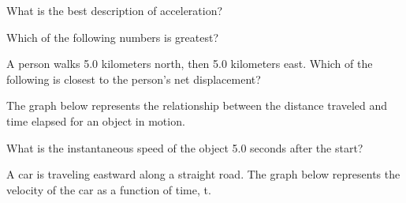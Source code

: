 \documentclass[10pt]{examdesign}
\begin{document}
\begin{multiplechoice} [title={Multiple Choice},
	rearrange=yes]
\begin{block}
\end{block}



\begin{question}
	What is the best description of acceleration?
\end{question}

\begin{question}
	Which of the following numbers is greatest?
	
\end{question}


\begin{question}
A person walks 5.0 kilometers north, then 5.0 kilometers east. Which of the following is closest to the person's net displacement?
\end{question}

\begin{question}

The graph below represents the relationship between the distance traveled and time elapsed for an object in motion.  


What is the instantaneous speed of the object 5.0 seconds after the start?


	\end{question}

\begin{question}
A car is traveling eastward along a straight road. The graph below represents the velocity of the car as a function of time, t.


\end{question}
\end{multiplechoice}
\end{document}
